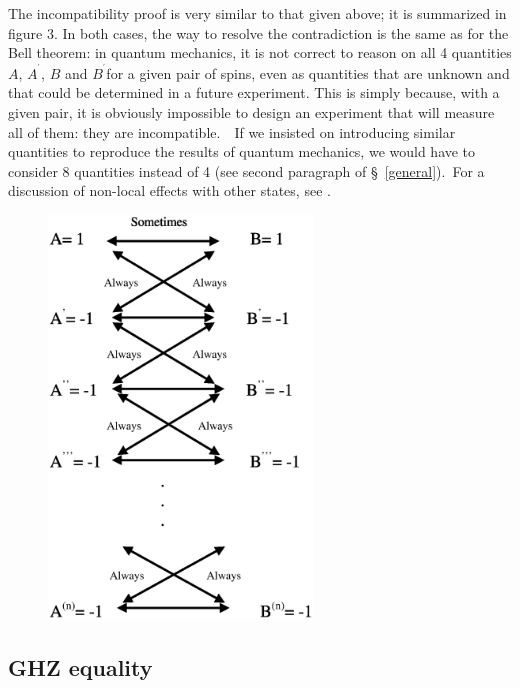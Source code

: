 \documentclass[12pt,onecolumn]{article}%
\begin{document}
The incompatibility proof is very similar to that given above; it is
summarized in figure 3. In both cases, the way to resolve the contradiction is
the same as for the Bell theorem: in quantum mechanics, it is not correct to
reason on all 4 quantities $A$, $A^{^{\prime}}$, $B$ and $B^{^{\prime}}$for a
given pair of spins, even as quantities that are unknown and that could be
determined in a future experiment. This is simply because, with a given pair,
it is obviously impossible to design an experiment that will measure all of
them: they are incompatible.\ \ If we insisted on introducing similar
quantities to reproduce the results of quantum mechanics, we would have to
consider 8 quantities instead of 4 (see second paragraph of \S \
\ref{general}).\ For a discussion of non-local effects with other states, see
\cite{Goldstein2}. \begin{figure}[ptb]
\begin{center}
\includegraphics[width=7cm]{fig3.ps}\newline
\end{center}
\caption{{}}%
\label{fig 3}%
\end{figure}

\subsection{GHZ equality}

\label{ghz}
\end{document}
